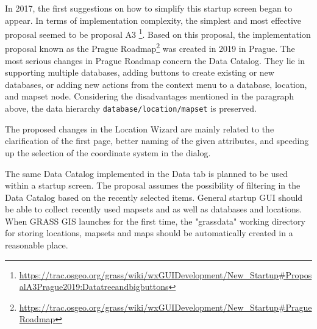 \documentclass[a4paper,10pt,twoside]{article}
\begin{document}
In 2017, the first suggestions on how to simplify this startup screen
began to appear. In terms of implementation complexity, the simplest
and most effective proposal seemed to be proposal A3
\footnote{\url{https://trac.osgeo.org/grass/wiki/wxGUIDevelopment/New\_Startup\#ProposalA3Prague2019:Datatreeandbigbuttons}}. Based
on this proposal, the implementation proposal known as the Prague
Roadmap\footnote{\url{https://trac.osgeo.org/grass/wiki/wxGUIDevelopment/New\_Startup\#PragueRoadmap}}
was created in 2019 in Prague.  The most serious changes in Prague
Roadmap concern the Data Catalog. They lie in supporting multiple
databases, adding buttons to create existing or new databases, or
adding new actions from the context menu to a database, location, and
mapset node. Considering the disadvantages mentioned in the paragraph
above, the data hierarchy \texttt{database/location/mapset} is
preserved. 

\noindent The proposed changes in the Location Wizard are mainly related to the
clarification of the first page, better naming of the given
attributes, and speeding up the selection of the coordinate system in
the dialog. 

The same Data Catalog implemented in the Data tab is
planned to be used within a startup screen. 
The proposal assumes the possibility of
filtering in the Data Catalog based on the recently selected
items. General startup GUI should be able to collect recently used mapsets and
as well as databases and locations. 
When GRASS GIS  launches for the first time, the "grassdata" working directory for
storing locations, mapsets and maps should be automatically created in
a reasonable place.

\end{document}
